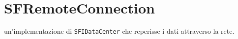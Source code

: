 \section{SFRemoteConnection}
\label{sec:sfremoteconnection}

un'implementazione di \texttt{SFIDataCenter} che reperisse i dati attraverso la rete. 


\section{} 
\label{sec:}








